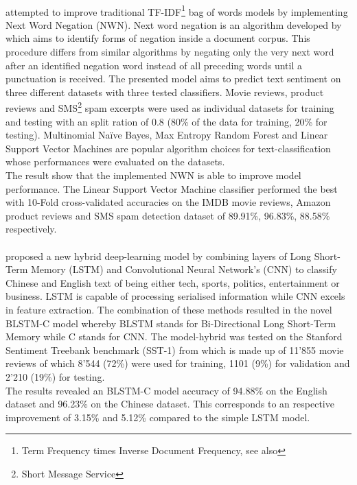 \paragraph*{\textcite{Das2018}} attempted to improve traditional TF-IDF\footnote{Term Frequency times Inverse Document Frequency, see also } bag of words models by implementing Next Word Negation (NWN). Next word negation is an algorithm developed by \textcite{Das2018} which aims to identify forms of negation inside a document corpus. This procedure differs from similar algorithms by negating only the very next word after an identified negation word instead of all preceding words until a punctuation is received. The presented model aims to predict text sentiment on three different datasets with three tested classifiers. Movie reviews, product reviews and SMS\footnote{Short Message Service} spam excerpts were used as individual datasets for training and testing with an split ration of 0.8 (80\% of the data for training, 20\%  for testing). Multinomial Na\"ive Bayes, Max Entropy Random Forest and Linear Support Vector Machines are popular algorithm choices for text-classification whose performances were evaluated on the datasets. \\
The result show that the implemented NWN is able to improve model performance. The Linear Support Vector Machine classifier performed the best with 10-Fold cross-validated accuracies on the IMDB movie reviews, Amazon product reviews and SMS spam detection dataset of 89.91\%, 96.83\%, 88.58\% respectively.

\paragraph*{\textcite{Li2018}} proposed a new hybrid deep-learning model by combining layers of Long Short-Term Memory (LSTM) and Convolutional Neural Network's (CNN) to classify Chinese and English text of being either tech, sports, politics, entertainment or business. LSTM is capable of processing serialised information while CNN excels in feature extraction. The combination of these methods resulted in the novel BLSTM-C model whereby BLSTM stands for Bi-Directional Long Short-Term Memory while C stands for CNN. The model-hybrid was tested on the Stanford Sentiment Treebank benchmark (SST-1) from \textcite{Socher2013} which is made up of 11'855 movie reviews of which 8'544 (72\%) were used for training, 1101 (9\%) for validation and 2'210 (19\%) for testing. \\The results revealed an BLSTM-C model accuracy
of 94.88\% on the English dataset and 96.23\% on the Chinese dataset. This corresponds to an respective improvement of 3.15\% and 5.12\% compared to the simple LSTM model.

